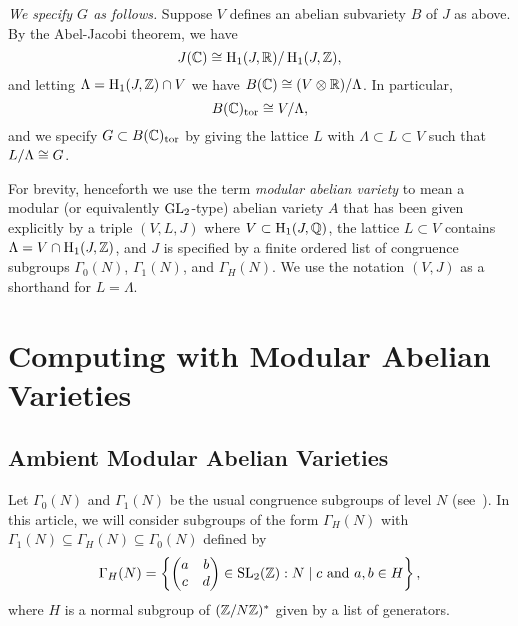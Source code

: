 \documentclass{article}
\begin{document}
{\em We specify $G$ as follows.}
Suppose $V$ defines an abelian subvariety $B$ of $J$ as above.
By the Abel-Jacobi theorem, we have
$$
 J(\mathbb{C}) \cong \operatorname{H}_1(J, \mathbb{R}) / \operatorname{H}_1(J,\mathbb{Z}),
$$
and letting $\Lambda = \operatorname{H}_1(J,\mathbb{Z}) \cap V$ we have
$B(\mathbb{C}) \cong (V\otimes\mathbb{R}) / \Lambda$.
In particular,
$$
  B(\mathbb{C})_{\operatorname{tor}} \cong V/\Lambda,
$$
and we specify $G\subset B(\mathbb{C})_{\operatorname{tor}}$ by giving the lattice $L$ with
$\Lambda \subset L\subset V$ such that $L/\Lambda \cong G$.


For brevity, henceforth we use the term {\em modular abelian variety}
to mean a modular (or equivalently $\operatorname{GL}_2$-type) abelian variety $A$
that has been given explicitly by a triple $(V,L,J)$ where $V\subset
\operatorname{H}_1(J,\mathbb{Q})$, the lattice $L\subset V$ contains $\Lambda = V\cap
\operatorname{H}_1(J,\mathbb{Z})$, and $J$ is specified by a finite ordered list of
congruence subgroups $\Gamma_0(N)$, $\Gamma_1(N)$, and $\Gamma_H(N)$.
We use the notation $(V,J)$ as a shorthand for $L=\Lambda$.



\section{Computing with Modular Abelian Varieties}

\subsection{Ambient Modular Abelian Varieties}
\label{sec:amb_modabvar}

Let $\Gamma_0(N)$ and $\Gamma_1(N)$ be the usual congruence subgroups of level
$N$ (see~\cite{stein:modform}). In this article, we will consider subgroups of
the form $\Gamma_H(N)$ with $\Gamma_1(N)\subseteq \Gamma_H(N)\subseteq
\Gamma_0(N)$ defined by
\[
    \Gamma_H(N) = 
    \left\{
    \begin{pmatrix}
        a & b \\
        c & d
    \end{pmatrix}
    \in \operatorname{SL}_2(\mathbb{Z}) :
    N\mid c \text{ and } a,b\in H
    \right\}, 
\]
where $H$ is a normal subgroup of $(\mathbb{Z}/N\mathbb{Z})^*$ given by a list of generators.
\end{document}
